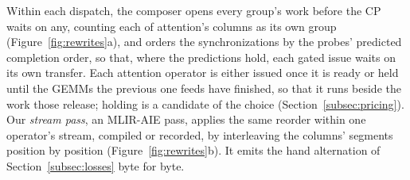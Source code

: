 Within each dispatch, the composer opens every group's work before the CP waits on any, counting each of attention's columns as its own group (Figure~\ref{fig:rewrites}a), and orders the synchronizations by the probes' predicted completion order, so that, where the predictions hold, each gated issue waits on its own transfer.
Each attention operator is either issued once it is ready or held until the GEMMs the previous one feeds have finished, so that it runs beside the work those release; holding is a candidate of the choice (Section~\ref{subsec:pricing}).
Our \emph{stream pass}, an MLIR-AIE pass, applies the same reorder within one operator's stream, compiled or recorded, by interleaving the columns' segments position by position (Figure~\ref{fig:rewrites}b).
It emits the hand alternation of Section~\ref{subsec:losses} byte for byte.

